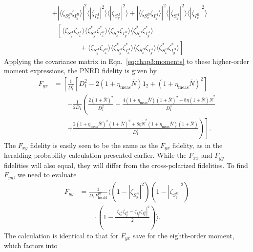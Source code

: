 \documentclass[aps,twocolumn,secnumarabic,amsmath,amssymb,pra,groupedaddress,
showpacs, showkeys]{revtex4-1}
\newcommand{\pna}[1]{\left(#1\right)}
\newcommand{\pnb}[1]{\left[#1\right]}
\begin{document}
\begin{align}
     &  + |\langle \zeta_{S_x^B} \zeta_{I_y^B}\rangle|^2 \langle| \zeta_{I_x^A}|^2\rangle \langle|\zeta_{S_y^A}|^2\rangle + |\langle \zeta_{S_x^B} \zeta_{I_y^A}\rangle|^2 \langle| \zeta_{S_y^A}|^2\rangle \langle|\zeta_{I_x^B}|^2\rangle \nonumber \\
     &-\left[\langle \zeta_{S_y^A} \zeta_{I_x^A}\rangle \langle \zeta_{S_y^{A}}^* \zeta_{I_x^{B}}^*\rangle \langle \zeta_{S_x^B} \zeta_{I_y^B}\rangle \langle \zeta_{S_x^{B}}^* \zeta_{I_y^{A}}^*\rangle \right.\nonumber \\
     & \left.\qquad\qquad + \langle \zeta_{S_y^A} \zeta_{I_x^B}\rangle \langle \zeta_{S_y^{A}}^* \zeta_{I_x^{A}}^*\rangle \langle \zeta_{S_x^B} \zeta_{I_y^A}\rangle \langle \zeta_{S_x^{B}}^* \zeta_{I_y^{B}}^*\rangle\right]
     \label{eq:yx:moment}
\end{align}
Applying the covariance matrix in Eqn.~\ref{eq:chap3:moments} to these
higher-order moment expressions, the PNRD fidelity is given by
\begin{align}
F_{yx}&=\left[\frac{1}{D_1^3}\pnb{D_1^2-2\pna{1+\eta_{\textrm{meas}}\bar{N}}1_2+\pna{1+\eta_{\textrm{meas}}\bar{N}}^2}\right.\nonumber\\
& \qquad \left.-\frac{1}{2D_1} \left(\frac{2\pna{1+\bar{N}}^2}{D_1^2}-\frac{4\pna{1+\eta_{\textrm{meas}}\bar{N}}\pna{1+\bar{N}}^2+8\eta\pna{1+\bar{N}}\tilde{N}^2}{D_1^3}\right.\right.\nonumber\\
& \qquad \left.\left.+\frac{2\pna{1+\eta_{\textrm{meas}}\bar{N}}^2\pna{1+\bar{N}}^2 +8 \eta \tilde{N}^2 \pna{1 + \eta_{\textrm{meas}} \bar{N}} \pna{1 + \bar{N}}}{D_1^4}\right)\right].
\end{align}
The $F_{xy}$ fidelity is easily seen to be the same as the $F_{yx}$ fidelity,
as in the heralding probability calculation presented earlier. While the
$F_{xx}$ and $F_{yy}$ fidelities will also equal, they will differ from the
cross-polarized fidelities. To find $F_{yy}$, we need to evaluate
\begin{align}
F_{yy} & = \frac{1}{D_1 P_{\textrm{herald}}^{yy}}\langle
\pna{1-|\zeta_{S_y^A}|^2}\pna{1-|\zeta_{S_y^B}|^2}\nonumber \\ & \qquad \cdot\pna{1-\frac{|\zeta_{I_x^A}\zeta_{I_y^B}-\zeta_{I_y^A}\zeta_{I_x^B}|^2}{2}}  \rangle.
\end{align}
The calculation is identical to that for $F_{yx}$ save for the eighth-order
moment, which factors into
\end{document}
